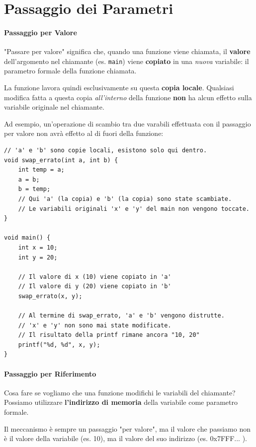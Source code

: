 \documentclass[oneside]{scrbook}
\begin{document}
\section{Passaggio dei Parametri}

\paragraph{Passaggio per Valore}

"Passare per valore" significa che, quando una funzione viene chiamata, il \textbf{valore} dell'argomento nel chiamante (es. \texttt{main}) viene \textbf{copiato} in una \emph{nuova} variabile: il parametro formale della funzione chiamata.

La funzione lavora quindi esclusivamente su questa \textbf{copia locale}. Qualsiasi modifica fatta a questa copia \emph{all'interno} della funzione \textbf{non} ha alcun effetto sulla variabile originale nel chiamante.

Ad esempio, un'operazione di scambio tra due varabili effettuata con il passaggio per valore non avrà effetto al di fuori della funzione:

\begin{lstlisting}[style=cstyle]
// 'a' e 'b' sono copie locali, esistono solo qui dentro.
void swap_errato(int a, int b) {
    int temp = a;
    a = b;
    b = temp;
    // Qui 'a' (la copia) e 'b' (la copia) sono state scambiate.
    // Le variabili originali 'x' e 'y' del main non vengono toccate.
}

void main() {
    int x = 10;
    int y = 20;
    
    // Il valore di x (10) viene copiato in 'a'
    // Il valore di y (20) viene copiato in 'b'
    swap_errato(x, y);
    
    // Al termine di swap_errato, 'a' e 'b' vengono distrutte.
    // 'x' e 'y' non sono mai state modificate.
    // Il risultato della printf rimane ancora "10, 20"
    printf("%d, %d", x, y); 
}
\end{lstlisting}

\paragraph{Passaggio per Riferimento}

Cosa fare se vogliamo che una funzione modifichi le variabili del chiamante? 
Possiamo utilizzare \textbf{l'indirizzo di memoria} della variabile come parametro formale.

Il meccanismo è sempre un passaggio "per valore", ma il valore che passiamo non è il valore della variabile (es. 10), ma il valore del suo indirizzo (es. 0x7FFF... ).
\end{document}
